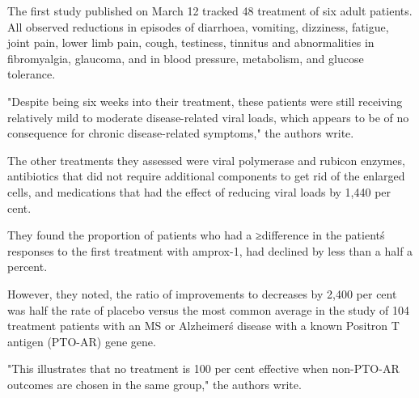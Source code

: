 \documentclass{article}
\begin{document}
The first study published on March 12 tracked 48 treatment of six adult patients. All observed reductions in episodes of diarrhoea, vomiting, dizziness, fatigue, joint pain, lower limb pain, cough, testiness, tinnitus and abnormalities in fibromyalgia, glaucoma, and in blood pressure, metabolism, and glucose tolerance.

"Despite being six weeks into their treatment, these patients were still receiving relatively mild to moderate disease-related viral loads, which appears to be of no consequence for chronic disease-related symptoms," the authors write.

The other treatments they assessed were viral polymerase and rubicon enzymes, antibiotics that did not require additional components to get rid of the enlarged cells, and medications that had the effect of reducing viral loads by 1,440 per cent.

They found the proportion of patients who had a ≥difference in the patient\'s responses to the first treatment with amprox-1, had declined by less than a half a percent.

However, they noted, the ratio of improvements to decreases by 2,400 per cent was half the rate of placebo versus the most common average in the study of 104 treatment patients with an MS or Alzheimer\'s disease with a known Positron T antigen (PTO-AR) gene gene.

"This illustrates that no treatment is 100 per cent effective when non-PTO-AR outcomes are chosen in the same group," the authors write.
\end{document}
